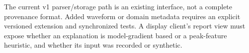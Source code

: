 The current v1 parser/storage path is an existing interface, not a complete provenance format. Added waveform or domain metadata requires an explicit versioned extension and synchronized tests. A display client's report view must expose whether an explanation is model-gradient based or a peak-feature heuristic, and whether its input was recorded or synthetic.
